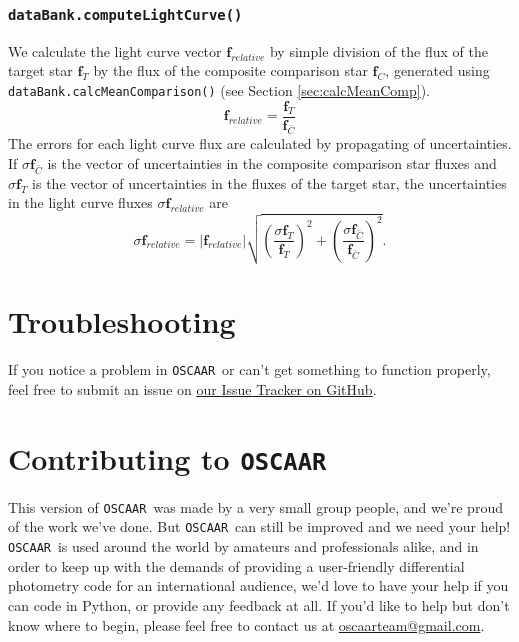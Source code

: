 \documentclass[a4paper]{article}
\newcommand{\code}[1]{\texttt{#1}}
\newcommand{\oscaar}{\code{OSCAAR}~}
\begin{document}
\subsubsection{\code{dataBank.computeLightCurve()}} \label{sec:computeLightCurve}
We calculate the light curve vector $\mathbf{f}_{relative}$ by simple division of the flux of the target star $\mathbf{f}_{T}$ by the flux of the composite comparison star $\mathbf{f}_{C}$, generated using \code{dataBank.calcMeanComparison()} (see Section \ref{sec:calcMeanComp}).
\begin{equation}
\mathbf{f}_{relative}  = \frac{\mathbf{f}_{T}}{\mathbf{f}_{\bar{C}}}
\end{equation}
The errors for each light curve flux are calculated by propagating of uncertainties. If $\sigma \mathbf{f}_{\bar{C}}$ is the vector of uncertainties in the composite comparison star fluxes and $\sigma \mathbf{f}_{T}$ is the vector of uncertainties in the fluxes of the target star, the uncertainties in the light curve fluxes $\sigma \mathbf{f}_{relative}$ are
\begin{equation}
\sigma \mathbf{f}_{relative}  = | \mathbf{f}_{relative} |  \sqrt{ \left(\frac{\sigma \mathbf{f}_{T}}{\mathbf{f}_{T}} \right)^2 + \left(\frac{\sigma \mathbf{f}_{\bar{C}}}{\mathbf{f}_{\bar{C}}} \right)^2 }.
\end{equation}

\section{Troubleshooting} \label{sec:issues}
If you notice a problem in \oscaar or can't get something to function properly, feel free to submit an issue on \href{https://github.com/OSCAAR/OSCAAR/issues?state=open}{our Issue Tracker on GitHub}. 

\section{Contributing to \oscaar}
This version of \oscaar was made by a very small group people, and we're proud of the work we've done. But \oscaar can still be improved and we need your help! \oscaar is used around the world by amateurs and professionals alike, and in order to keep up with the demands of providing a user-friendly differential photometry code for an international audience, we'd love to have your help if you can code in Python, or provide any feedback at all. If you'd like to help but don't know where to begin, please feel free to contact us at \href{mailto:oscaarteam@gmail.com}{oscaarteam@gmail.com}. 
\end{document}
